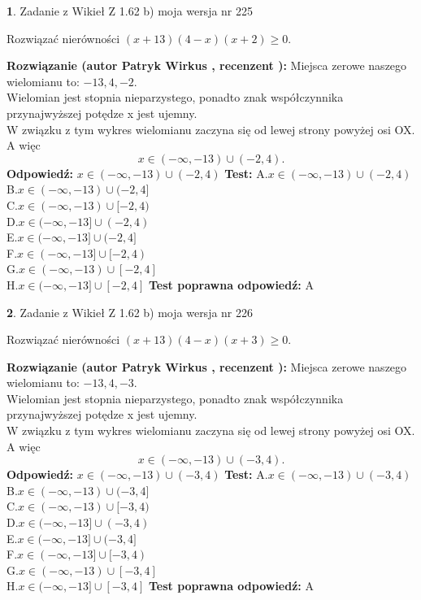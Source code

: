 \documentclass[12pt, a4paper]{article}
\theoremstyle{definition} %
\newtheorem{zad}{}
\newcommand{\zadStart}[1]{\begin{zad}#1\newline}
\newcommand{\zadStop}{\end{zad}}
\newcommand{\rozwStart}[2]{\noindent \textbf{Rozwiązanie (autor #1 , recenzent #2): }\newline}
\newcommand{\rozwStop}{\newline}
\newcommand{\odpStart}{\noindent \textbf{Odpowiedź:}\newline}
\newcommand{\odpStop}{\newline}
\newcommand{\testStart}{\noindent \textbf{Test:}\newline}
\newcommand{\testStop}{\newline}
\newcommand{\kluczStart}{\noindent \textbf{Test poprawna odpowiedź:}\newline}
\newcommand{\kluczStop}{\newline}
\begin{document}
\zadStart{Zadanie z Wikieł Z 1.62 b) moja wersja nr 225}

Rozwiązać nierówności $(x+13)(4-x)(x+2)\ge0$.
\zadStop
\rozwStart{Patryk Wirkus}{}
Miejsca zerowe naszego wielomianu to: $-13, 4, -2$.\\
Wielomian jest stopnia nieparzystego, ponadto znak współczynnika przy\linebreak najwyższej potędze x jest ujemny.\\ W związku z tym wykres wielomianu zaczyna się od lewej strony powyżej osi OX. A więc $$x \in (-\infty,-13) \cup (-2,4).$$
\rozwStop
\odpStart
$x \in (-\infty,-13) \cup (-2,4)$
\odpStop
\testStart
A.$x \in (-\infty,-13) \cup (-2,4)$\\
B.$x \in (-\infty,-13) \cup (-2,4]$\\
C.$x \in (-\infty,-13) \cup [-2,4)$\\
D.$x \in (-\infty,-13] \cup (-2,4)$\\
E.$x \in (-\infty,-13] \cup (-2,4]$\\
F.$x \in (-\infty,-13] \cup [-2,4)$\\
G.$x \in (-\infty,-13) \cup [-2,4]$\\
H.$x \in (-\infty,-13] \cup [-2,4]$
\testStop
\kluczStart
A
\kluczStop



\zadStart{Zadanie z Wikieł Z 1.62 b) moja wersja nr 226}

Rozwiązać nierówności $(x+13)(4-x)(x+3)\ge0$.
\zadStop
\rozwStart{Patryk Wirkus}{}
Miejsca zerowe naszego wielomianu to: $-13, 4, -3$.\\
Wielomian jest stopnia nieparzystego, ponadto znak współczynnika przy\linebreak najwyższej potędze x jest ujemny.\\ W związku z tym wykres wielomianu zaczyna się od lewej strony powyżej osi OX. A więc $$x \in (-\infty,-13) \cup (-3,4).$$
\rozwStop
\odpStart
$x \in (-\infty,-13) \cup (-3,4)$
\odpStop
\testStart
A.$x \in (-\infty,-13) \cup (-3,4)$\\
B.$x \in (-\infty,-13) \cup (-3,4]$\\
C.$x \in (-\infty,-13) \cup [-3,4)$\\
D.$x \in (-\infty,-13] \cup (-3,4)$\\
E.$x \in (-\infty,-13] \cup (-3,4]$\\
F.$x \in (-\infty,-13] \cup [-3,4)$\\
G.$x \in (-\infty,-13) \cup [-3,4]$\\
H.$x \in (-\infty,-13] \cup [-3,4]$
\testStop
\kluczStart
A
\kluczStop
\end{document}
